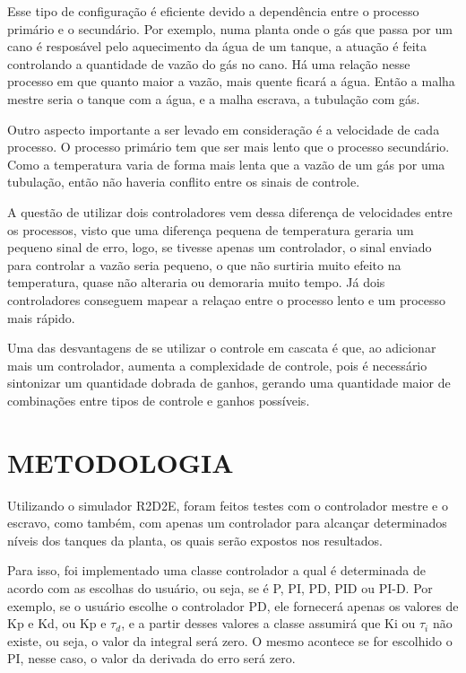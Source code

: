\documentclass[a4paper,12pt]{article}
\begin{document}
Esse tipo de configuração é eficiente devido a dependência entre o processo primário e o secundário. Por exemplo, numa planta onde o gás que passa por um cano é resposável pelo aquecimento da água de um tanque, a atuação é feita controlando a quantidade de vazão do gás no cano. Há uma relação nesse processo em que quanto maior a vazão, mais quente ficará a água. Então a malha mestre seria o tanque com a água, e a malha escrava, a tubulação com gás. 

Outro aspecto importante a ser levado em consideração é a velocidade de cada processo. O processo primário tem que ser mais lento que o processo secundário. Como a temperatura varia de forma mais lenta que a vazão de um gás por uma tubulação, então não haveria conflito entre os sinais de controle. 

A questão de utilizar dois controladores vem dessa diferença de velocidades entre os processos, visto que uma diferença pequena de temperatura geraria um pequeno sinal de erro, logo, se tivesse apenas um controlador, o sinal enviado para controlar a vazão seria pequeno, o que não surtiria muito efeito na temperatura, quase não alteraria ou demoraria muito tempo. Já dois controladores conseguem mapear a relaçao entre o processo lento e um processo mais rápido. 

Uma das desvantagens de se utilizar o controle em cascata é que, ao adicionar mais um controlador, aumenta a complexidade de controle, pois é necessário sintonizar um quantidade dobrada de ganhos, gerando uma quantidade maior de combinações entre tipos de controle e ganhos possíveis. 




\newpage


\thispagestyle{main}

\section{METODOLOGIA}

\hspace{4ex}Utilizando o simulador R2D2E, foram feitos testes com o controlador mestre e o escravo, como também, com apenas um controlador para alcançar determinados níveis dos tanques da planta, os quais serão expostos nos resultados.

\hspace{4ex}Para isso, foi implementado uma classe controlador a qual é determinada de acordo com as escolhas do usuário, ou seja, se é P, PI, PD, PID ou PI-D. Por exemplo, se o usuário escolhe o controlador PD, ele fornecerá apenas os valores de Kp e Kd, ou Kp e $\tau_d$, e a partir desses valores a classe assumirá que Ki ou $\tau_i$ não existe, ou seja, o valor da integral será zero. O mesmo acontece se for escolhido o PI, nesse caso, o valor da derivada do erro será zero.
\end{document}
